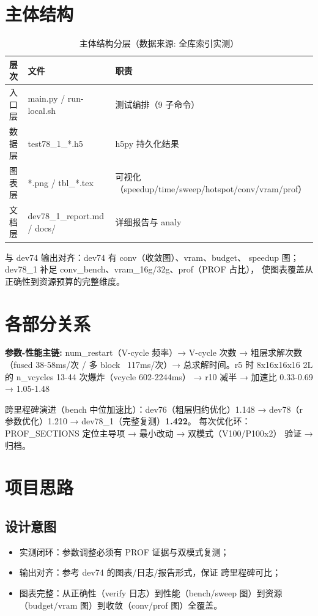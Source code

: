 \documentclass[UTF8]{ctexart}
\begin{document}
\section{主体结构}
\begin{table}[htbp]\centering
\begin{tabularx}{\textwidth}{llX}
\toprule
\textcolor{struct}{层次} & 文件 & \textcolor{struct}{职责} \\
\midrule
入口层 & main.py / run-local.sh & 测试编排（9 子命令） \\
数据层 & test78\_1\_*.h5 & h5py 持久化结果 \\
图表层 & *.png / tbl\_*.tex & 可视化（speedup/time/sweep/hotspot/conv/vram/prof） \\
文档层 & dev78\_1\_report.md / docs/ & 详细报告与 analy \\
\bottomrule
\end{tabularx}
\caption{主体结构分层（数据来源: 全库索引实测）}
\end{table}

\textcolor{struct}{与 dev74 输出对齐}：dev74 有 conv（收敛图）、vram、budget、
speedup 图；dev78\_1 补足 conv\_bench、vram\_16g/32g、prof（PROF 占比），
使图表覆盖从正确性到资源预算的完整维度。

\section{各部分关系}
\begin{keybox}
\textbf{参数-性能主链:} \textcolor{relation}{num\_restart（V-cycle 频率）→
V-cycle 次数 → 粗层求解次数（fused 38-58ms/次 / 多 block ~117ms/次）→
总求解时间。r5 时 8x16x16x16 2L 的 n\_vcycles 13-44 次爆炸（vcycle 602-2244ms）
→ r10 减半 → 加速比 0.33-0.69 → 1.05-1.48}
\end{keybox}

跨里程碑演进（bench 中位加速比）：dev76（粗层归约优化）1.148 →
dev78（r 参数优化）1.210 → dev78\_1（完整复测）\textbf{1.422}。
每次优化环：PROF\_SECTIONS 定位主导项 → 最小改动 → 双模式（V100/P100x2）
验证 → 归档。

\section{项目思路}
\subsection{设计意图}
\begin{itemize}
\item \textcolor{idea}{实测闭环}：参数调整必须有 PROF 证据与双模式复测；
\item \textcolor{idea}{输出对齐}：参考 dev74 的图表/日志/报告形式，保证
  跨里程碑可比；
\item \textcolor{idea}{图表完整}：从正确性（verify 日志）到性能（bench/sweep
  图）到资源（budget/vram 图）到收敛（conv/prof 图）全覆盖。
\end{itemize}
\end{document}
